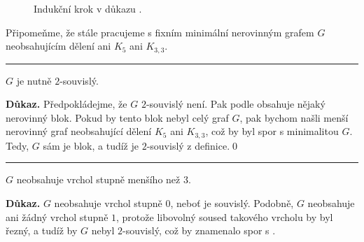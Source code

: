 \begin{enhproof}
 \begin{figure}[H]
  \centering

  \caption{Indukční krok v důkazu .}
  \label{fig:graf-rovinny-iff-bloky-rovinne}
 \end{figure}

 Připomeňme, že stále pracujeme s fixním minimální nerovinným grafem $G$
 neobsahujícím dělení ani $K_5$ ani $K_{3,3}$.\\

 \hrule

 \begin{auxilprop}
  \label{auxilprop:G-2-souvisly}
  $G$ je nutně $2$-souvislý.
 \end{auxilprop}
 \textbf{\sffamily Důkaz.} Předpokládejme, že $G$ $2$-souvislý není. Pak podle
  obsahuje
 nějaký nerovinný blok. Pokud by tento blok nebyl celý graf $G$, pak bychom
 našli menší nerovinný graf neobsahující dělení $K_5$ ani $K_{3,3}$, což by byl
 spor s minimalitou $G$. Tedy, $G$ sám je blok, a tudíž je $2$-souvislý z
 definice.\hfill\qed\\

 \hrule

 \begin{auxilprop}
  \label{auxilprop:G-nema-stupen-2}
  $G$ neobsahuje vrchol stupně menšího než $3$.
 \end{auxilprop}
 \textbf{\sffamily Důkaz.} $G$ neobsahuje vrchol stupně $0$, neboť je souvislý.
 Podobně, $G$ neobsahuje ani žádný vrchol stupně $1$, protože libovolný soused
 takového vrcholu by byl řezný, a tudíž by $G$ nebyl $2$-souvislý, což by
 znamenalo spor s .


\end{enhproof}
